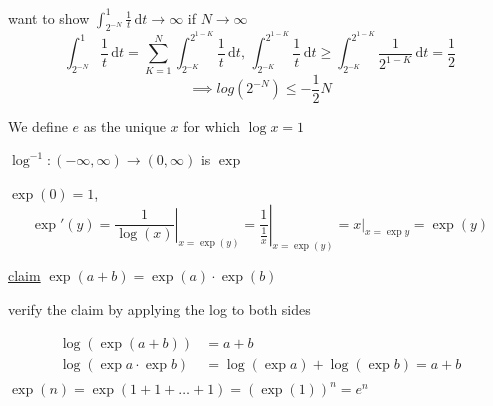 want to show $\displaystyle\int_{2^{-N}}^1 \frac{1}{t}\,\mathrm{d}t \to \infty$ if $N \to \infty$
\[\int_{2^{-N}}^1 \frac{1}{t}\,\mathrm{d}t = \sum_{K=1}^{N} \int_{2^{-K}}^{2^{1-K}} \frac{1}{t}\,\mathrm{d}t,\, \int_{2^{-K}}^{2^{1-K}} \frac{1}{t}\,\mathrm{d}t \ge \int_{2^{-K}}^{2^{1-K}} \frac{1}{2^{1-K}}\,\mathrm{d}t = \frac{1}{2}\]
\[ \implies log(2^{-N}) \le -\frac{1}{2}N\]

We define $e$ as the unique $x$ for which $\log x = 1$

\begin{center}
\end{center}

$\log^{-1}:(-\infty, \infty) \to (0, \infty)$ is $\exp$

$\exp(0) = 1$, 
$$\exp'(y) = \left.\frac{1}{\log(x)}\right|_{x=\exp(y)} = \left.\frac{1}{\frac{1}{x}}\right|_{x=\exp(y)}=\left.x\right|_{x=\exp{y}} = \exp(y)$$


\underline{claim}
$\exp(a+b) = \exp(a)\cdot\exp(b)$

verify the claim by applying the log to both sides

\begin{align*}
  \log(\exp(a+b)) &= a + b\\
  \log(\exp a \cdot \exp b) &= \log(\exp a) + \log(\exp b) = a + b\\
\end{align*}
$\exp(n) = \exp(1 + 1 + \dotsc + 1) = (\exp(1))^n = e^n$